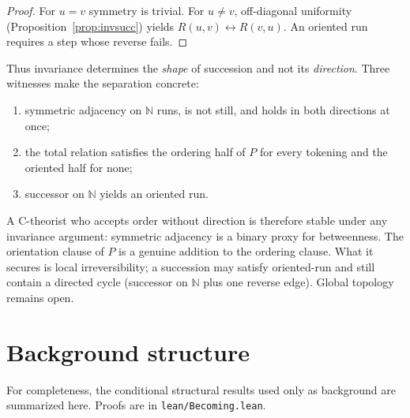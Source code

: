 \documentclass[11pt]{article}
\newcommand{\lf}[1]{\texttt{#1}}
\begin{document}
\begin{proof}
For \(u=v\) symmetry is trivial. For \(u\neq v\), off-diagonal uniformity
(Proposition~\ref{prop:invsucc}) yields \(R(u,v)\leftrightarrow R(v,u)\). An
oriented run requires a step whose reverse fails.
\end{proof}

Thus invariance determines the \emph{shape} of succession and not its
\emph{direction}. Three witnesses make the separation concrete:
\begin{enumerate}[itemsep=1pt,leftmargin=*]
\item symmetric adjacency on \(\mathbb{N}\) runs, is not still, and holds in
both directions at once;
\item the total relation satisfies the ordering half of \(P\) for every
tokening and the oriented half for none;
\item successor on \(\mathbb{N}\) yields an oriented run.
\end{enumerate}
A C-theorist who accepts order without direction \cite{farr2020,mctaggart1908}
is therefore stable under any invariance argument: symmetric adjacency is a
binary proxy for betweenness. The orientation clause of \(P\) is a genuine
addition to the ordering clause. What it secures is local irreversibility; a
succession may satisfy oriented-run and still contain a directed cycle
(successor on \(\mathbb{N}\) plus one reverse edge). Global topology remains
open.

\section{Background structure}
\label{sec:structure}

For completeness, the conditional structural results used only as background
are summarized here. Proofs are in \lf{lean/Becoming.lean}.
\end{document}
